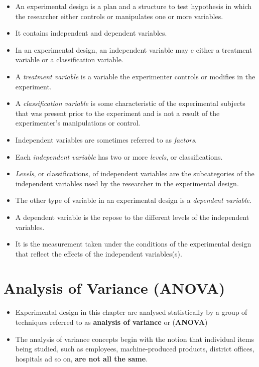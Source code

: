 \documentclass[]{book}
\begin{document}
\begin{itemize}
\item
  An experimental design is a plan and a structure to test hypothesis in which the researcher either controls or manipulates one or more variables.
\item
  It contains independent and dependent variables.
\item
  In an experimental design, an independent variable may e either a treatment variable or a classification variable.
\item
  A \emph{treatment variable} is a variable the experimenter controls or modifies in the experiment.
\item
  A \emph{classification variable} is some characteristic of the experimental subjects that was present prior to the experiment and is not a result of the experimenter's manipulations or control.
\item
  Independent variables are sometimes referred to as \emph{factors}.
\item
  Each \emph{independent variable} has two or more \emph{levels}, or classifications.
\item
  \emph{Levels}, or classifications, of independent variables are the subcategories of the independent variables used by the researcher in the experimental design.
\item
  The other type of variable in an experimental design is a \emph{dependent variable}.
\item
  A dependent variable is the repose to the different levels of the independent variables.
\item
  It is the measurement taken under the conditions of the experimental design that reflect the effects of the independent variables(s).
\end{itemize}

\hypertarget{analysis-of-variance-anova}{%
\section{Analysis of Variance (ANOVA)}\label{analysis-of-variance-anova}}

\begin{itemize}
\item
  Experimental design in this chapter are analysed statistically by a group of techniques referred to as \textbf{analysis of variance} or (\textbf{ANOVA})
\item
  The analysis of variance concepts begin with the notion that individual items being studied, such as employees, machine-produced products, district offices, hospitals ad so on, \textbf{are not all the same}.
\end{itemize}
\end{document}
